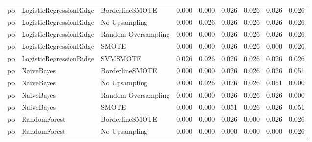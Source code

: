 \begin{tabular}{lllllllll}
      po &      LogisticRegressionRidge &     BorderlineSMOTE & 0.000 &                     0.000 &                 0.026 &                  0.026 &                                   0.026 &     0.026 \\
      po &      LogisticRegressionRidge &       No Upsampling & 0.000 &                     0.026 &                 0.026 &                  0.026 &                                   0.026 &     0.026 \\
      po &      LogisticRegressionRidge & Random Oversampling & 0.000 &                     0.000 &                 0.026 &                  0.026 &                                   0.026 &     0.026 \\
      po &      LogisticRegressionRidge &               SMOTE & 0.000 &                     0.000 &                 0.026 &                  0.026 &                                   0.000 &     0.026 \\
      po &      LogisticRegressionRidge &            SVMSMOTE & 0.026 &                     0.026 &                 0.026 &                  0.026 &                                   0.026 &     0.026 \\
      po &                   NaiveBayes &     BorderlineSMOTE & 0.000 &                     0.000 &                 0.026 &                  0.026 &                                   0.026 &     0.051 \\
      po &                   NaiveBayes &       No Upsampling & 0.000 &                     0.026 &                 0.026 &                  0.026 &                                   0.051 &     0.000 \\
      po &                   NaiveBayes & Random Oversampling & 0.000 &                     0.000 &                 0.026 &                  0.026 &                                   0.026 &     0.000 \\
      po &                   NaiveBayes &               SMOTE & 0.000 &                     0.000 &                 0.051 &                  0.026 &                                   0.026 &     0.051 \\
      po &                 RandomForest &     BorderlineSMOTE & 0.000 &                     0.000 &                 0.026 &                  0.000 &                                   0.026 &     0.026 \\
      po &                 RandomForest &       No Upsampling & 0.000 &                     0.000 &                 0.000 &                  0.000 &                                   0.000 &     0.026 \\

\end{tabular}
